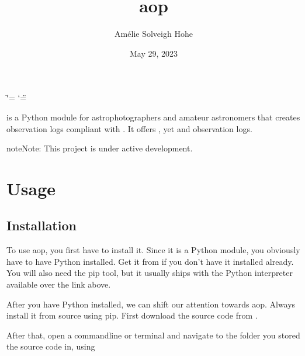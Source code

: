 \documentclass[letterpaper,10pt,english]{sphinxmanual}
\title{aop}
\date{May 29, 2023}
\author{Amélie Solveigh Hohe}
\begin{document}
\ifdefined\shorthandoff
  \ifnum\catcode`\=\string=\active\shorthandoff{=}\fi
  \ifnum\catcode`\"=\active{}\fi
\fi

\pagestyle{empty}
\sphinxmaketitle
\pagestyle{plain}
\sphinxtableofcontents
\pagestyle{normal}
\label{\detokenize{index::doc}}


\sphinxAtStartPar
{} is a Python module for astrophotographers and amateur astronomers that
creates observation logs compliant with . It offers , yet  and
 observation logs.

\begin{sphinxadmonition}{note}{Note:}
\sphinxAtStartPar
This project is under active development.
\end{sphinxadmonition}

\sphinxstepscope


\chapter{Usage}
\label{\detokenize{usage:usage}}\label{\detokenize{usage::doc}}

\section{Installation}
\label{\detokenize{usage:installation}}
\sphinxAtStartPar
To use aop, you first have to install it. Since it is a Python module, you
obviously have to have Python installed. Get it from  if you don’t have it installed already.
You will also need the pip tool, but it usually ships with the Python
interpreter available over the link above.

\sphinxAtStartPar
After you have Python installed, we can shift our attention towards aop. Always
install it from source using pip. First download the source code from
.

\sphinxAtStartPar
After that, open a command\sphinxhyphen{}line or terminal and navigate to the folder you
stored the source code in, using

\begin{sphinxVerbatim}[commandchars=\\\{\}]
\end{sphinxVerbatim}
\end{document}
